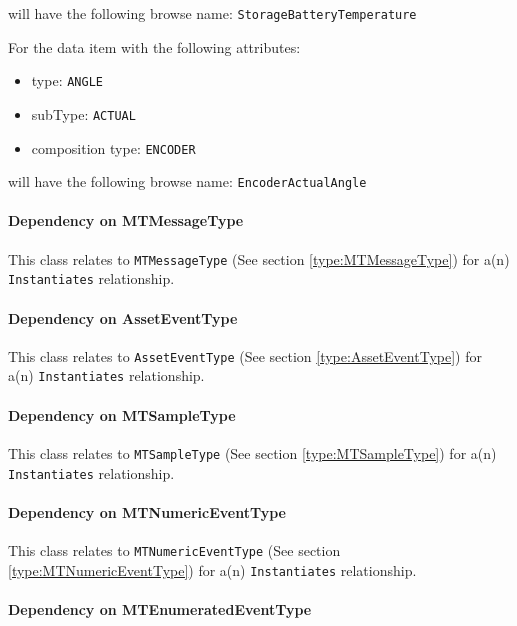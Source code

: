 \begin{itemize}
will have the following browse name: \texttt{StorageBatteryTemperature}

For the data item with the following attributes:

\begin{itemize}
\item type: \texttt{ANGLE}
\item subType: \texttt{ACTUAL}
\item composition type: \texttt{ENCODER}
\end{itemize}

will have the following browse name: \texttt{EncoderActualAngle}


\end{itemize}
\paragraph{Dependency on MTMessageType}

This class relates to \texttt{MTMessageType} (See section \ref{type:MTMessageType}) for a(n) \texttt{Instantiates} relationship.

\paragraph{Dependency on AssetEventType}

This class relates to \texttt{AssetEventType} (See section \ref{type:AssetEventType}) for a(n) \texttt{Instantiates} relationship.

\paragraph{Dependency on MTSampleType}

This class relates to \texttt{MTSampleType} (See section \ref{type:MTSampleType}) for a(n) \texttt{Instantiates} relationship.

\paragraph{Dependency on MTNumericEventType}

This class relates to \texttt{MTNumericEventType} (See section \ref{type:MTNumericEventType}) for a(n) \texttt{Instantiates} relationship.

\paragraph{Dependency on MTEnumeratedEventType}

